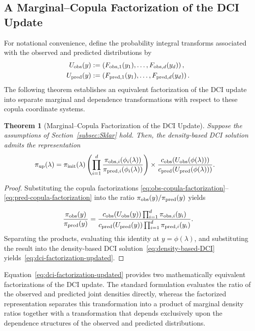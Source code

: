 \documentclass{article}
\newtheorem{theorem}{Theorem}[section]
\begin{document}
\subsection{A Marginal--Copula Factorization of the DCI Update}

For notational convenience, define the probability integral transforms associated with the observed and predicted distributions by
\begin{align}
U_{\rm obs}(y)
&:=
\left(
F_{{\rm obs},1}(y_1),
\ldots,
F_{{\rm obs},d}(y_d)
\right),
\label{eq:Uobs}
\\
U_{\rm pred}(y)
&:=
\left(
F_{{\rm pred},1}(y_1),
\ldots,
F_{{\rm pred},d}(y_d)
\right).
\label{eq:Upred}
\end{align}
The following theorem establishes an equivalent factorization of the DCI update into separate marginal and dependence transformations with respect to these copula coordinate systems.

\begin{theorem}[Marginal--Copula Factorization of the DCI Update]
Suppose the assumptions of Section~\ref{subsec:Sklar} hold. Then, the density-based DCI solution admits the representation
\begin{align}
\pi_{\rm up}(\lambda)
&=
\pi_{\rm init}(\lambda)
\left(
\prod_{i=1}^{d}
\frac{\pi_{{\rm obs},i}(\phi_i(\lambda))}
     {\pi_{{\rm pred},i}(\phi_i(\lambda))}
\right)\times
\frac{
c_{\rm obs}(U_{\rm obs}(\phi(\lambda)))
}{
c_{\rm pred}(U_{\rm pred}(\phi(\lambda)))
}.
\label{eq:dci-factorization-updated}
\end{align}

\end{theorem}

\begin{proof}
Substituting the copula factorizations
\eqref{eq:obs-copula-factorization}--\eqref{eq:pred-copula-factorization}
into the ratio $\pi_{\rm obs}(y)/\pi_{\rm pred}(y)$
yields

\[
\frac{\pi_{\rm obs}(y)}
     {\pi_{\rm pred}(y)}
=
\frac{
c_{\rm obs}(U_{\rm obs}(y))
\prod_{i=1}^{d}\pi_{{\rm obs},i}(y_i)
}{
c_{\rm pred}(U_{\rm pred}(y))
\prod_{i=1}^{d}\pi_{{\rm pred},i}(y_i)
}.
\]
Separating the products, evaluating this identity at
$y=\phi(\lambda)$,
and substituting the result into the density-based DCI solution~\eqref{eq:density-based-DCI} yields~\eqref{eq:dci-factorization-updated}.
\end{proof}

Equation~\eqref{eq:dci-factorization-updated} provides two mathematically equivalent factorizations of the DCI update.
The standard formulation evaluates the ratio of the observed and predicted joint densities directly, whereas the factorized representation separates this transformation into a product of marginal density ratios together with a transformation that depends exclusively upon the dependence structures of the observed and predicted distributions.
\end{document}
